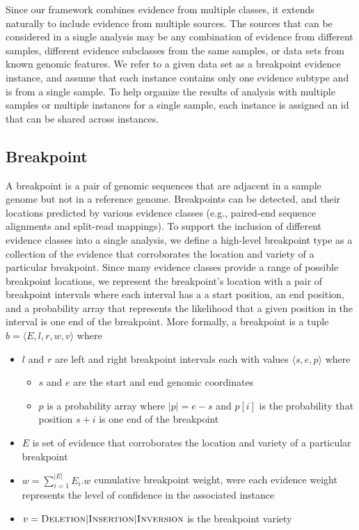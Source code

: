 \documentclass[11pt]{article}
\begin{document}
Since our framework combines evidence from multiple classes, it extends
naturally to include evidence from multiple sources.  The sources that can be
considered in a single analysis may be any combination of evidence from
different samples, different evidence subclasses from the same samples, or
data sets from known genomic features.  We refer to a given data set as a
breakpoint evidence instance, and assume that each instance contains only one
evidence subtype and is from a single sample.  To help organize the results of
analysis with multiple samples or multiple instances for a single sample,
each instance is assigned an id that can be shared across instances.


\subsection{Breakpoint}

A breakpoint is a pair of genomic sequences that are adjacent in a sample genome
but not in a reference genome. Breakpoints can be detected, and their locations
predicted by various evidence classes (e.g., paired-end sequence alignments and
split-read mappings).  To support the inclusion of different evidence classes
into a single analysis, we define a high-level breakpoint type as a collection
of the evidence that corroborates the location and variety of a particular
breakpoint.  Since many evidence classes provide a range of possible breakpoint
locations, we represent the breakpoint's location with a pair of breakpoint
intervals where each interval has a a start position, an end position, and a
probability array that represents the likelihood that a given position in the
interval is one end of the breakpoint.  More formally, a breakpoint is a tuple 
$b=\langle E,l,r,w,v \rangle$ where
\begin{itemize}
\item $l$ and $r$ are left and right breakpoint intervals each with values
	$\langle s, e, p \rangle$ where
	\begin{itemize}
		\item $s$ and $e$ are the start and end genomic coordinates
		\item $p$ is a probability array where $|p|=e-s$ and $p[i]$ is the
		probability that position $s+i$ is one end of the breakpoint
	\end{itemize}
\item $E$ is set of evidence that corroborates the location and variety of a
particular breakpoint
\item $w=\sum\limits_{i=1}^{|E|} E_i.w $ cumulative breakpoint weight, were
each evidence weight represents the level of confidence in the associated
instance 
\item $v=\textsc{Deletion}|\textsc{Insertion}|\textsc{Inversion}$ is the
breakpoint variety
\end{itemize}
\end{document}
